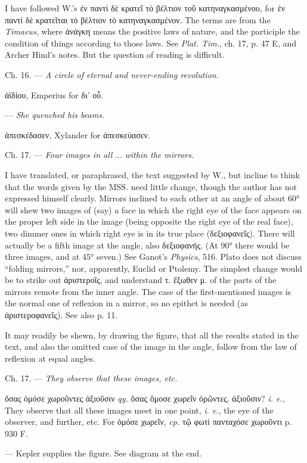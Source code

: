 \documentclass[a4paper, 11pt, oneside, polutonikogreek, english]{article}
\begin{document}
I have followed W.'s ἐν παντὶ δὲ κρατεῖ τὸ βέλτιον τοῦ κατηναγκασμένου, for ἐν παντὶ δὲ κρατεῖται τὸ βέλτιον τὸ κατηναγκασμένον. The terms are from the \emph{Timaeus}, where ἀνάγκη means the positive laws of nature, and the participle the condition of things according to those laws. See \emph{Plat. Tim.}, ch. 17, p. 47 E, and Archer Hind's notes. But the question of reading is difficult.

Ch. 16. --- \emph{A circle of eternal and never-ending revolution.}

ἀϊδίου, Emperius for δι' οὗ.

--- \emph{She quenched his beams.}

ἀπεσκέδασεν, Xylander for ἀπεσκεύασεν.

Ch. 17. --- \emph{Four images in all} ... \emph{within the mirrors.}

I have translated, or paraphrased, the text suggested by W., but incline to think that the words given by the MSS. need little change, though the author has not expressed himself clearly. Mirrors inclined to each other at an angle of about 60° will shew two images of (say) a face in which the right eye of the face appears on the proper left side in the image (being opposite the right eye of the real face), two dimmer ones in which right eye is in its true place (δεξιοφανεῖς). There will actually be a fifth image at the angle, also δεξιοφανής. (At 90° there would be three images, and at 45° seven.) See Ganot's \emph{Physics}, 516. Plato does not discuss ``folding mirrors,'' nor, apparently, Euclid or Ptolemy. The simplest change would be to strike out ἀριστεροῖς, and understand τ. ἔξωθεν μ. of the parts of the mirrors remote from the inner angle. The case of the first-mentioned images is the normal one of reflexion in a mirror, so no epithet is needed (as ἀριστεροφανεῖς). See also p. 11.

It may readily be shewn, by drawing the figure, that all the results stated in the text, and also the omitted case of the image in the angle, follow from the law of reflexion at equal angles.

Ch. 17. --- \emph{They observe that these images, etc.}

ὅσας ὁμόσε χωροῦντες ἀξιοῦσιν \emph{qy.} ὅσας ὅμοσε χωρεῖν ὁρῶντες, ἀξιοῦσιν? \emph{i. e.}, They observe that all these images meet in one point, \emph{i. e.}, the eye of the observer, and further, etc. For ὁμόσε χωρεῖν, \emph{cp.} τῷ φωτὶ πανταχόσε χωροῦντι p. 930 F.

--- Kepler supplies the figure. See diagram at the end.
\end{document}
